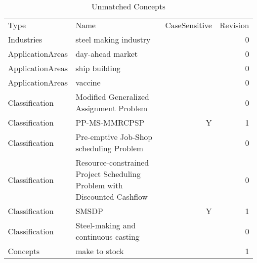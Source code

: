 {\scriptsize
\begin{longtable}{lp{10cm}rr}
\rowcolor{white}\caption{Unmatched Concepts}\\ \toprule
\rowcolor{white}Type & Name & CaseSensitive & Revision\\ \midrule
\endhead
\bottomrule
\endfoot
Industries & steel making industry &  & 0\\ApplicationAreas & day-ahead market &  & 0\\ApplicationAreas & ship building &  & 0\\ApplicationAreas & vaccine &  & 0\\Classification & Modified Generalized Assignment Problem &  & 0\\Classification & PP-MS-MMRCPSP & Y & 1\\Classification & Pre-emptive Job-Shop scheduling Problem &  & 0\\Classification & Resource-constrained Project Scheduling Problem with Discounted Cashflow &  & 0\\Classification & SMSDP & Y & 1\\Classification & Steel-making and continuous casting &  & 0\\Concepts & make to stock &  & 1\\\end{longtable}
}

